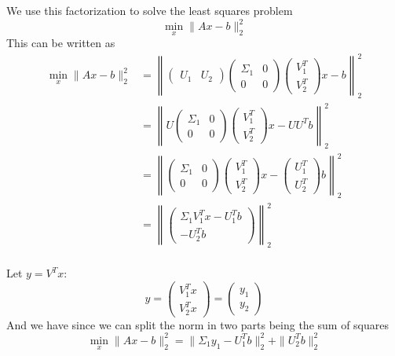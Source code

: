 \documentclass[a4paper, 12pt]{article}
\begin{document}
We use this factorization to solve the least squares problem
\[
    \min_x \| Ax - b \|_2^2
\]
This can be written as
\[
\begin{aligned}
    \min_x \| Ax - b \|_2^2 &=
    \left\|
        \begin{pmatrix} U_1 & U_2 \end{pmatrix}
        \begin{pmatrix} \Sigma_1 & 0 \\ 0 & 0 \end{pmatrix}
        \begin{pmatrix} V_1^T \\ V_2^T \end{pmatrix}
        x - b
    \right\|_2^2 \\
    & = \left\|
        U \begin{pmatrix}
        \Sigma_1 & 0 \\
        0 & 0 
        \end{pmatrix}
        \begin{pmatrix}
            V_1^T \\
            V_2^T
        \end{pmatrix}
        x - UU^T b
    \right\|_2^2 \\
    & = \left\|
    \begin{pmatrix}
        \Sigma_1 & 0 \\
        0 & 0 
        \end{pmatrix}
        \begin{pmatrix}
            V_1^T \\
            V_2^T
        \end{pmatrix}
        x - 
        \begin{pmatrix}
            U_1^T \\
            U_2^T
        \end{pmatrix}b
    \right\|_2^2 \\
    & = \left\|
        \begin{pmatrix}
            \Sigma_1 V_1^T x - U_1^T b\\
            - U_2^T b
        \end{pmatrix}
    \right\|_2^2 \\
\end{aligned}
\]

Let $y = V^T x$:
\[
y = \begin{pmatrix}
V_1^Tx \\
V_2^Tx
\end{pmatrix} = \begin{pmatrix}
y_1 \\
y_2
\end{pmatrix}
\]
And we have since we can split the norm in two parts being the sum of squares
\[
\min_x \| Ax - b \|_2^2 = \| \Sigma_1 y_1 - U_1^T b \|_2^2 + \| U_2^T b \|_2^2
\]
\end{document}
